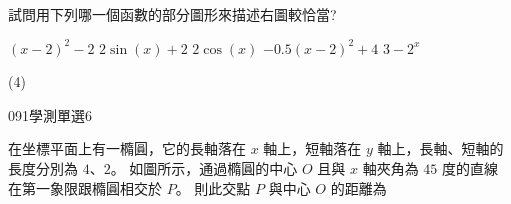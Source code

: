 \begin{QUESTIONS}
\begin{QUESTION}
        \begin{ExamAnsRateInfo}{52}{82}{54}{20}
        \end{ExamAnsRateInfo}
        \begin{QBODY}
            試問用下列哪一個函數的部分圖形來描述右圖較恰當?
            \begin{QOPS}
            \QOP $(x-2)^{2}-2$  
            \QOP $2\sin(x)+2$
            \QOP $2\cos(x)$ 
            \QOP $-0.5(x-2)^{2}+4$ 
            \QOP $3-2^{x}$ 
            \end{QOPS}
        \end{QBODY}
        \begin{QFROMS}
        \end{QFROMS}
        \begin{QTAGS}\end{QTAGS}
        \begin{QANS}
            (4)
        \end{QANS}
        \begin{QSOLLIST}
        \end{QSOLLIST}
        \begin{QEMPTYSPACE}
        \end{QEMPTYSPACE}
    \end{QUESTION}
    \begin{QUESTION}
        \begin{ExamInfo}{091}{學測}{單選}{6}
        \end{ExamInfo}
        \begin{ExamAnsRateInfo}{33}{53}{32}{14}
        \end{ExamAnsRateInfo}
        \begin{QBODY}
            在坐標平面上有一橢圓，它的長軸落在 $x$ 軸上，短軸落在 $y$ 軸上，長軸、短軸的長度分別為 $4$、$2$。
            如圖所示，通過橢圓的中心 $O$ 且與 $x$ 軸夾角為 $45$ 度的直線在第一象限跟橢圓相交於 $P$。 則此交點 $P$ 與中心 $O$ 的距離為 
            

\end{QBODY}
\end{QUESTION}
\end{QUESTIONS}

